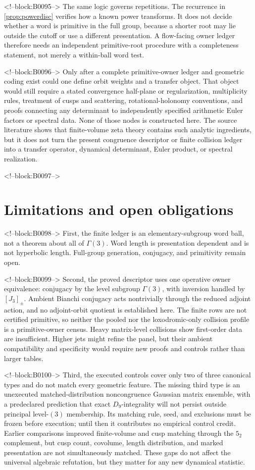 \documentclass[11pt,a4paper]{article}
\theoremstyle{definition}
\theoremstyle{remark}
\begin{document}
<!--block:B0095-->
The same logic governs repetitions. The recurrence in \cref{prop:powerdisc} verifies how a known power transforms. It does not decide whether a word is primitive in the full group, because a shorter root may lie outside the cutoff or use a different presentation. A flow-facing owner ledger therefore needs an independent primitive-root procedure with a completeness statement, not merely a within-ball word test.

<!--block:B0096-->
Only after a complete primitive-owner ledger and geometric coding exist could one define orbit weights and a transfer object. That object would still require a stated convergence half-plane or regularization, multiplicity rules, treatment of cusps and scattering, rotational-holonomy conventions, and proofs connecting any determinant to independently specified arithmetic Euler factors or spectral data. None of those nodes is constructed here. The source literature shows that finite-volume zeta theory contains such analytic ingredients, but it does not turn the present congruence descriptor or finite collision ledger into a transfer operator, dynamical determinant, Euler product, or spectral realization.

<!--block:B0097-->
\section{Limitations and open obligations}

<!--block:B0098-->
First, the finite ledger is an elementary-subgroup word ball, not a theorem about all of \(\Gamma(3)\). Word length is presentation dependent and is not hyperbolic length. Full-group generation, conjugacy, and primitivity remain open.

<!--block:B0099-->
Second, the proved descriptor uses one operative owner equivalence: conjugacy by the level subgroup \(\Gamma(3)\), with inversion handled by \([J_3]_{\pm}\). Ambient Bianchi conjugacy acts nontrivially through the reduced adjoint action, and no adjoint-orbit quotient is established here. The finite rows are not certified primitive, so neither the pooled nor the loxodromic-only collision profile is a primitive-owner census. Heavy matrix-level collisions show first-order data are insufficient. Higher jets might refine the panel, but their ambient compatibility and specificity would require new proofs and controls rather than larger tables.

<!--block:B0100-->
Third, the executed controls cover only two of three canonical types and do not match every geometric feature. The missing third type is an unexecuted matched-distribution noncongruence Gaussian matrix ensemble, with a predeclared prediction that exact \(D_9\)-integrality will not persist outside principal level-\((3)\) membership. Its matching rule, seed, and exclusions must be frozen before execution; until then it contributes no empirical control credit. Earlier comparisons improved finite-volume and cusp matching through the \(5_2\) complement, but cusp count, covolume, length distribution, and marked presentation are not simultaneously matched. These gaps do not affect the universal algebraic refutation, but they matter for any new dynamical statistic.
\end{document}
